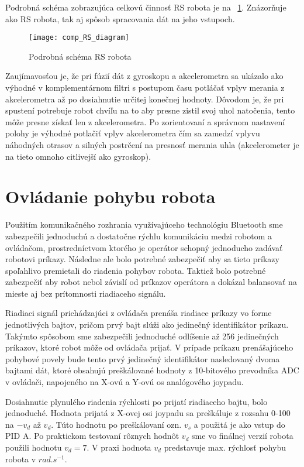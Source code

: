 Podrobná schéma zobrazujúca celkovú činnosť \ac{RS} robota je na \figurename~\ref{fig:podrobna_schema}. Znázorňuje ako RS robota, tak aj spôsob spracovania dát na jeho vstupoch.
\begin{figure}[!b]
\centering
\texttt{[image: comp\_RS\_diagram]}
\caption{Podrobná schéma RS robota}
\label{fig:podrobna_schema}
\end{figure}

Zaujímavosťou je, že pri fúzií dát z gyroskopu a akcelerometra sa ukázalo ako výhodné v komplementárnom filtri s postupom času potláčať vplyv merania z akcelerometra až po dosiahnutie určitej konečnej hodnoty. Dôvodom je, že pri spustení potrebuje robot chvíľu na to aby presne zistil svoj uhol natočenia, tento môže presne získať len z akcelerometra. Po zorientovaní a správnom nastavení polohy je výhodné potlačiť vplyv akcelerometra čím sa zamedzí vplyvu náhodných otrasov a silných postrčení na presnosť merania uhla (akcelerometer je na tieto omnoho citlivejší ako gyroskop).

\section{Ovládanie pohybu robota}
Použitím komunikačného rozhrania využívajúceho technológiu Bluetooth sme zabezpečili jednoduchú a dostatočne rýchlu komunikáciu medzi robotom a ovládačom, prostredníctvom ktorého je operátor schopný jednoducho zadávať robotovi príkazy. Následne ale bolo potrebné zabezpečiť aby sa tieto príkazy spoľahlivo premietali do riadenia pohybov robota. Taktiež bolo potrebné zabezpečiť aby robot nebol závislí od príkazov operátora a dokázal balansovať na mieste aj bez prítomnosti riadiaceho signálu.

Riadiaci signál prichádzajúci z ovládača prenáša riadiace príkazy vo forme jednotlivých bajtov, pričom prvý bajt slúži ako jedinečný identifikátor príkazu. Takýmto spôsobom sme zabezpečili jednoduché odlíšenie až 256 jedinečných príkazov, ktoré robot môže od ovládača prijať. V prípade príkazu prenášajúceho pohybové povely bude tento prvý jedinečný identifikátor nasledovaný dvoma bajtami dát, ktoré obsahujú preškálované hodnoty z 10-bitového prevodníka ADC v ovládači, napojeného na X-ovú a Y-ovú os analógového joypadu.  

Dosiahnutie plynulého riadenia rýchlosti po prijatí riadiaceho bajtu, bolo jednoduché. Hodnota prijatá z X-ovej osi joypadu sa preškáluje z rozsahu 0-100 na $-v_d$ až $v_d$. Túto hodnotu po preškálovaní ozn. $v_s$ a použitá je ako vstup do PID A. Po praktickom testovaní rôznych hodnôt $v_d$ sme vo finálnej verzií robota použili hodnotu $v_d = 7$. V praxi hodnota $v_d$ predstavuje max. rýchlosť pohybu robota v $rad.s^{-1}$.

